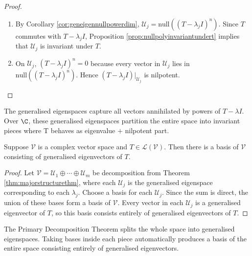 \begin{theorem}
\begin{proof}
\begin{enumerate}[label=\roman*.]
Since $\mathcal{U} \subseteq \mathcal{V}$ and $\text{dim}(\mathcal{U}) = \text{dim}(\mathcal{V})$, hence $\mathcal{V} = \mathcal{U}_1 + \cdots + \mathcal{U}_m$.\\
As $\text{dim}(\mathcal{V}) = \text{dim}(\mathcal{U}_1) + \cdots + \text{dim}(\mathcal{U}_m)$, the sum is direct. Hence $\mathcal{V} = \mathcal{U}_1 \oplus \cdots \oplus \mathcal{U}_m$.
\item[$(ii)$] By Corollary \ref{cor:geneigennullpowerdim}, $\mathcal{U}_j = \text{null}((T - \lambda_j I)^{n})$. Since $T$ commutes with $T - \lambda_j I$, Proposition \ref{prop:nullpolyinvariantundert} implies that $\mathcal{U}_j$ is invariant under $T$.
\item[$(iii)$] On $\mathcal{U}_j$, $(T - \lambda_j I)^n = 0$ because every vector in $\mathcal{U}_j$ lies in $\text{null}((T - \lambda_j I)^n)$. Hence $(T - \lambda_j I)|_{\mathcal{U}_j}$ is nilpotent.
\end{enumerate}
\end{proof}
\end{theorem}

The generalised eigenspaces capture all vectors annihilated by powers of $T - \lambda I$. Over $\C$, these generalised eigenspaces partition the entire space into invariant pieces where T behaves as eigenvalue $+$ nilpotent part.

\begin{corollary} Suppose $\mathcal{V}$ is a complex vector space and $T \in \mathcal{L}(\mathcal{V})$. Then there is a basis of $\mathcal{V}$ consisting of generalised eigenvectors of $T$.
\begin{proof} Let $\mathcal{V} = \mathcal{U}_1 \oplus \cdots \oplus \mathcal{U}_m$ be decomposition from Theorem \ref{thm:majorstructurethm}, where each $\mathcal{U}_j$ is the generalised eigenspace corresponding to each $\lambda_j$. Choose a basis for each $\mathcal{U}_j$. Since the sum is direct, the union of these bases form a basis of $\mathcal{V}$. Every vector in each $\mathcal{U}_j$ is a generalised eigenvector of $T$, so this basis consists entirely of generalised eigenvectors of $T$.
\end{proof}
\end{corollary}

The Primary Decomposition Theorem splits the whole space into generalised eigenspaces. Taking bases inside each piece automatically produces a basis of the entire space consisting entirely of generalised eigenvectors.

